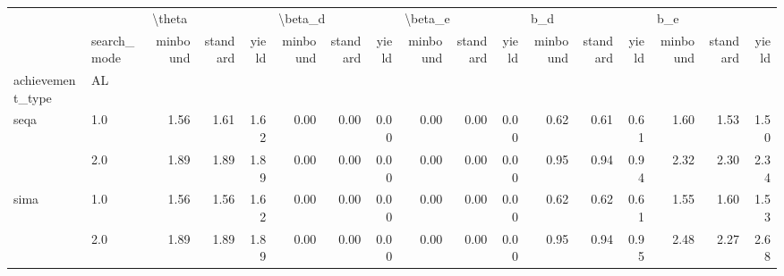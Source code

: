 \begin{tabular}{llrrrrrrrrrrrrrrr}
\toprule
     & {} & \multicolumn{3}{l}{\textbackslash theta} & \multicolumn{3}{l}{\textbackslash beta\_d} & \multicolumn{3}{l}{\textbackslash beta\_e} & \multicolumn{3}{l}{b\_d} & \multicolumn{3}{l}{b\_e} \\
     & search\_mode & minbound & standard & yield & minbound & standard & yield & minbound & standard & yield & minbound & standard & yield & minbound & standard & yield \\
achievement\_type & AL &          &          &       &          &          &       &          &          &       &          &          &       &          &          &       \\
\midrule
seqa & 1.0 &     1.56 &     1.61 &  1.62 &     0.00 &     0.00 &  0.00 &     0.00 &     0.00 &  0.00 &     0.62 &     0.61 &  0.61 &     1.60 &     1.53 &  1.50 \\
     & 2.0 &     1.89 &     1.89 &  1.89 &     0.00 &     0.00 &  0.00 &     0.00 &     0.00 &  0.00 &     0.95 &     0.94 &  0.94 &     2.32 &     2.30 &  2.34 \\
sima & 1.0 &     1.56 &     1.56 &  1.62 &     0.00 &     0.00 &  0.00 &     0.00 &     0.00 &  0.00 &     0.62 &     0.62 &  0.61 &     1.55 &     1.60 &  1.53 \\
     & 2.0 &     1.89 &     1.89 &  1.89 &     0.00 &     0.00 &  0.00 &     0.00 &     0.00 &  0.00 &     0.95 &     0.94 &  0.95 &     2.48 &     2.27 &  2.68 \\
\bottomrule
\end{tabular}
